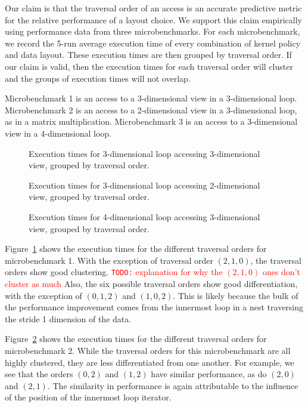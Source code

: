 \documentclass[sigconf, table]{acmart}
\newcommand{\todo}[1]{{\textcolor{red}{{\tt{TODO:}}\,\,#1 }}}
\begin{document}
Our claim is that the traversal order of an access is an accurate predictive metric for the relative performance of a layout choice. 
We support this claim empirically using performance data from three microbenchmarks.
For each microbenchmark, we record the 5-run average execution time of every combination of kernel policy and data layout. 
These execution times are then grouped by traversal order.
If our claim is valid, then the execution times for each traversal order will cluster and the groups of execution times will not overlap.

Microbenchmark 1 is an access to a 3-dimensional view in a 3-dimensional loop. 
Microbenchmark 2 is an access to a 2-dimensional view in a 3-dimensional loop, as in a matrix multiplication.
Microbenchmark 3 is an access to a 3-dimensional view in a 4-dimensional loop.


\begin{figure}
\caption{Execution times for 3-dimensional loop accessing 3-dimensional view, grouped by traversal order.}
\label{TraversalBenchmark1}
\end{figure}

\begin{figure}
	\caption{Execution times for 3-dimensional loop accessing 2-dimensional view, grouped by traversal order.}
	\label{TraversalBenchmark2}
\end{figure}

\begin{figure}
	\caption{Execution times for 4-dimensional loop accessing 3-dimensional view, grouped by traversal order.}
	\label{TraversalBenchmark3}
\end{figure}

Figure~\ref{TraversalBenchmark1} shows the execution times for the different traversal orders for microbenchmark 1. 
With the exception of traversal order $(2,1,0)$, the traversal orders show good clustering.
\todo{explanation for why the $(2,1,0)$ ones don't cluster as much}
Also, the six possible traversal orders show good differentiation, with the exception of $(0,1,2)$ and $(1,0,2)$. 
This is likely because the bulk of the performance improvement comes from the innermost loop in a nest traversing the stride 1 dimension of the data.



Figure~\ref{TraversalBenchmark2} shows the execution times for the different traversal orders for microbenchmark 2. 
While the traversal orders for this microbenchmark are all highly clustered, they are less differentiated from one another. 
For example, we see that the orders $(0,2)$ and $(1,2)$ have similar performance, as do $(2,0)$ and $(2,1)$. 
The similarity in performance is again attributable to the influence of the position of the innermost loop iterator. 
\end{document}
